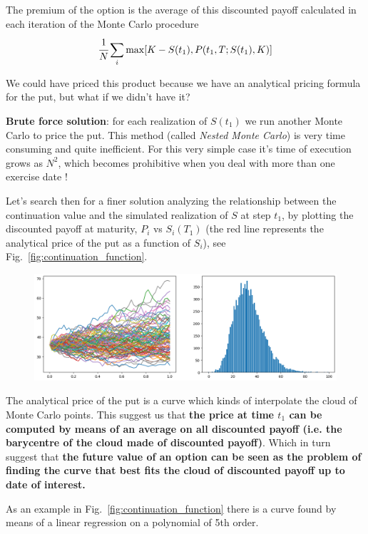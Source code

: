 \documentclass[12pt,a4paper]{book}
\begin{document}
The premium of the option is the average of this discounted payoff calculated in each iteration of the Monte Carlo procedure
\begin{equation}
	\cfrac{1}{N}\sum_i\max[K-S(t_1), P(t_1,T;S(t_1),K)]
\end{equation}

We could have priced this product because we have an analytical pricing formula for the put, but what if we didn't have it?

\textbf{Brute force solution}: for each realization of $S(t_1)$ we run another Monte Carlo to price the put. This method (called \emph{Nested Monte Carlo}) is very time consuming and quite inefficient. For this very simple case it's time of execution grows as $N^2$, which becomes prohibitive when you deal with more than one exercise date !

Let's search then for a finer solution analyzing the relationship between the continuation value and the simulated realization of $S$ at step $t_1$, by plotting the discounted payoff at maturity, $P_i$ vs $S_i(T_1)$ (the red line represents the analytical price of the put as a function of $S_i$), see Fig.~\ref{fig:continuation_function}.

\begin{figure}[htbp]
	\begin{center}
		\includegraphics[width=0.8\linewidth]{addons/lsm_paths}
	\end{center}
	\label{fig:lsm_paths}
\end{figure}

The analytical price of the put is a curve which kinds of interpolate the cloud of Monte Carlo points. This suggest us that
\textbf{the price at time $t_1$ can be computed by means of an average on all discounted payoff (i.e. the barycentre of the cloud made of discounted payoff)}.
Which in turn suggest that \textbf{the future value of an option can be seen as the problem of finding the curve that best fits the cloud of discounted payoff up to date of interest.}

As an example in Fig.~\ref{fig:continuation_function} there is a curve found by means of a linear regression on a polynomial of 5th order.
\end{document}
